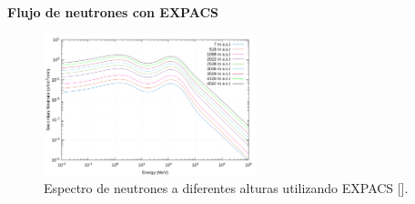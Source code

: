     \begin{frame}{} %
        \justifying %
        \vspace*{-0.1cm} %

        \begin{tcolorbox}[colback=custombgcolor4, coltext=customfgcolor2,
                      colframe=custombgcolor4, %
                      width=\textwidth,       %
                      boxrule=1pt,            %
                      top=1mm, bottom=1mm,     %
                      sharp corners=all,     %
                      halign=center,         %
                      valign=center,         %
                      ]
            \textbf{Flujo de neutrones con EXPACS}        
        \end{tcolorbox}
        
        \begin{figure}
            \centering
            \includegraphics[width=0.55\textwidth]{Figures/Neutron_flux.png}
            \caption{\tiny Espectro de neutrones a diferentes alturas utilizando EXPACS [\cite{sedrati2022}].}
        \end{figure}
    \end{frame}

